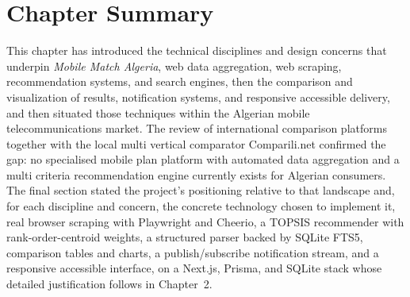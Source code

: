 \section{Chapter Summary}

This chapter has introduced the technical disciplines and design concerns that underpin \textit{Mobile Match Algeria}, web data aggregation, web scraping, recommendation systems, and search engines, then the comparison and visualization of results, notification systems, and responsive accessible delivery, and then situated those techniques within the Algerian mobile telecommunications market. The review of international comparison platforms together with the local multi vertical comparator Comparili.net confirmed the gap: no specialised mobile plan platform with automated data aggregation and a multi criteria recommendation engine currently exists for Algerian consumers. The final section stated the project's positioning relative to that landscape and, for each discipline and concern, the concrete technology chosen to implement it, real browser scraping with Playwright and Cheerio, a TOPSIS recommender with rank-order-centroid weights, a structured parser backed by SQLite FTS5, comparison tables and charts, a publish/subscribe notification stream, and a responsive accessible interface, on a Next.js, Prisma, and SQLite stack whose detailed justification follows in Chapter~2.
